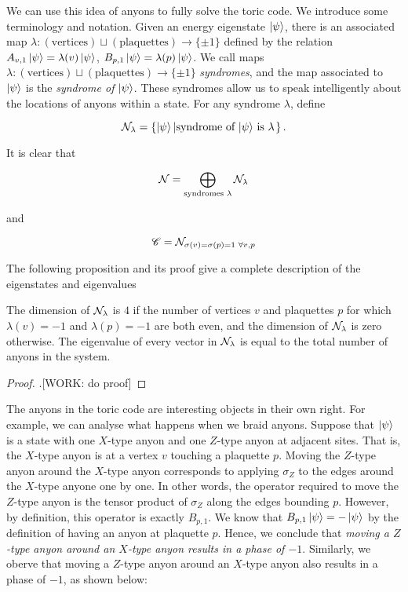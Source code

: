 We can use this idea of anyons to fully solve the toric code. We introduce some terminology and notation. Given an energy eigenstate $\ket{\psi}$, there is an associated map $\lambda: (\text{vertices})\sqcup (\text{plaquettes})\to \{\pm 1\}$ defined by the relation $A_{v,1}\ket{\psi}=\lambda(v)\ket{\psi}$, $B_{p,1}\ket{\psi}=\lambda(p)\ket{\psi}$. We call maps $\lambda: (\text{vertices})\sqcup (\text{plaquettes})\to \{\pm 1\}$ \textit{syndromes}, and the map associated to $\ket{\psi}$ is the \textit{syndrome of $\ket{\psi}$}. These syndromes allow us to speak intelligently about the locations of anyons within a state. For any syndrome $\lambda$, define

$$\mathcal{N}_\lambda=\left\{\ket{\psi}\left| \text{syndrome of $\ket{\psi}$ is $\lambda$}\right.\right\}.$$

It is clear that

$$\mathcal{N}=\bigoplus_{\text{syndromes $\lambda$}}\mathcal{N}_\lambda$$

and

$$\mathscr{C}=\mathcal{N}_{\sigma(v)=\sigma(p)=1 \,\, \forall v,p}$$

The following proposition and its proof give a complete description of the eigenstates and eigenvalues

\begin{proposition}The dimension of $\mathcal{N}_{\lambda}$ is $4$ if the number of vertices $v$ and plaquettes $p$ for which $\lambda(v)=-1$ and $\lambda(p)=-1$ are both even, and the dimension of $\mathcal{N}_{\lambda}$ is zero otherwise. The eigenvalue of every vector in $\mathcal{N}_{\lambda}$ is equal to the total number of anyons in the system.
\end{proposition}
\begin{proof}.[WORK: do proof]
\end{proof}

The anyons in the toric code are interesting objects in their own right. For example, we can analyse what happens when we braid anyons. Suppose that $\ket{\psi}$ is a state with one $X$-type anyon and one $Z$-type anyon at adjacent sites. That is, the $X$-type anyon is at a vertex $v$ touching a plaquette $p$. Moving the $Z$-type anyon around the $X$-type anyon corresponds to applying $\sigma_Z$ to the edges around the $X$-type anyone one by one. In other words, the operator required to move the $Z$-type anyon is the tensor product of $\sigma_Z$ along the edges bounding $p$. However, by definition, this operator is exactly $B_{p,1}$. We know that $B_{p,1}\ket{\psi}=-\ket{\psi}$ by the definition of having an anyon at plaquette $p$. Hence, we conclude that \textit{moving a $Z$-type anyon around an $X$-type anyon results in a phase of $-1$}. Similarly, we oberve that moving a $Z$-type anyon around an $X$-type anyon also results in a phase of $-1$, as shown below:

